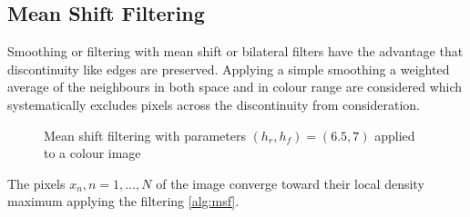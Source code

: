 \subsection{Mean Shift Filtering} %
\label{sub:mean_shift_filtering}
Smoothing or filtering with mean shift or bilateral filters have the
advantage that discontinuity like edges are preserved. Applying a
simple smoothing a weighted average of the neighbours in both space and
in colour range are considered which systematically excludes pixels
across the discontinuity from consideration.

\begin{figure}[ht]
  \centering
  \caption{Mean shift filtering with parameters $(h_r, h_f) = (6.5,
    7)$ applied to a colour image}
  \label{fig:filtsample}
\end{figure}

The pixels $x_n, n = 1, \ldots, N$ of the image converge toward their
local density maximum applying the filtering \autoref{alg:msf}.

